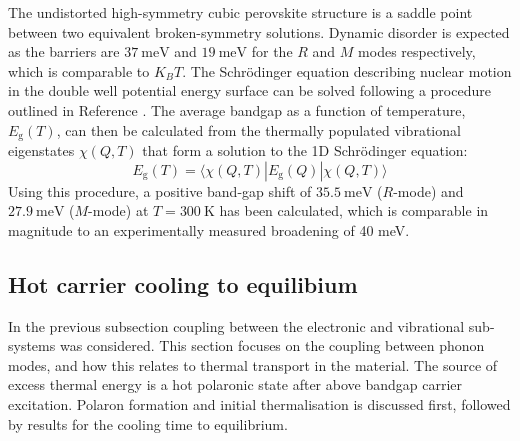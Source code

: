 \begin{table}
The undistorted high-symmetry cubic perovskite structure is a saddle point between two equivalent broken-symmetry solutions. Dynamic disorder is expected as the barriers are $37\ \textrm{meV}$ and $19\ \textrm{meV}$ for the $R$ and $M$ modes respectively, which is comparable to $K_BT$. 
The Schr\"{o}dinger equation describing nuclear motion in the double well potential energy surface can be solved following a procedure outlined in Reference \cite{Skelton2016a}. %
The average bandgap as a function of temperature, $E_\mathrm{g}(T)$, can then be calculated from the thermally populated vibrational eigenstates $\chi(Q,T)$ that form a solution to the 1D Schr\"{o}dinger equation:
\begin{equation}
E_\mathrm{g}(T) = \langle \chi(Q,T)|E_\mathrm{g}(Q)|\chi(Q,T) \rangle
\end{equation}
Using this procedure, a positive band-gap shift of $35.5\ \textrm{meV}$ ($R$-mode) and $27.9\ \textrm{meV}$ ($M$-mode) at $T=300\ \textrm{K}$ has been calculated, which is comparable in magnitude to an experimentally measured broadening of 40 meV.\autocite{Wright2016} 

\subsection{Hot carrier cooling to equilibium} \label{ch5:epcoupling}
In the previous subsection coupling between the electronic and vibrational sub-systems was considered. This section focuses on the coupling between phonon modes, and how this relates to thermal transport in the material. The source of excess thermal energy is a hot polaronic state after above bandgap carrier excitation. Polaron formation and initial thermalisation is discussed first, followed by results for the cooling time to equilibrium.


\end{table}
